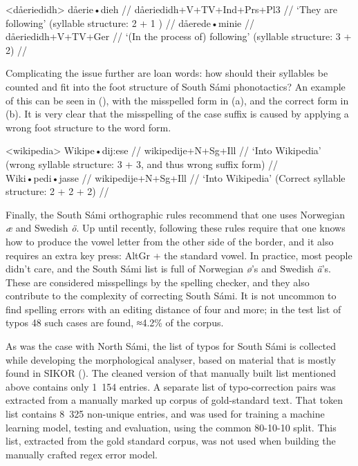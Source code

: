 \documentclass{flammie}
\begin{document}
\pex<dåeriedidh>
\a
\begingl
\gla dåerie•dieh //
\glb dåeriedidh+V+TV+Ind+Prs+Pl3 //
\glft `They are following' (syllable structure: 2 + 1 ) //
\endgl
\a
\begingl
\gla dåerede•minie //
\glb dåeriedidh+V+TV+Ger //
\glft `(In the process of) following' (syllable structure: 3 + 2) //
\endgl
\xe


Complicating the issue further are loan words: how should their syllables be
counted and fit into the foot structure of South Sámi phonotactics? An example
of this can be seen in (\nextx), with the misspelled form in (\nextx a), and the
correct form in (\nextx b). It is very clear that the misspelling of the case
suffix is caused by applying a wrong foot structure to the word form.

\pex<wikipedia>
\a
\begingl
\gla Wikipe•dij:ese //
\glb wikipedije+N+Sg+Ill //
\glft `Into Wikipedia' (wrong syllable structure: 3 + 3, and thus wrong suffix form) //
\endgl
\a
\begingl
\gla Wiki•pedi•jasse //
\glb wikipedije+N+Sg+Ill //
\glft `Into Wikipedia' (Correct syllable structure: 2 + 2 + 2) //
\endgl
\xe


Finally, the South Sámi orthographic rules recommend that one uses Norwegian
\textit{æ} and Swedish \textit{ö}. Up until recently, following these rules
require that one knows how to produce the vowel letter from the other side of
the border, and it also requires an extra key press: AltGr + the standard vowel.
In practice, most people didn't care, and the South Sámi list is full of
Norwegian \textit{ø}'s and Swedish \textit{ä}'s. These are considered
misspellings by the spelling checker, and they also contribute to the complexity
of correcting South Sámi. It is not uncommon to find spelling errors with an
editing distance of four and more; in the test list of typos 48 such cases are
found, ≈4.2\% of the corpus.

As was the case with North Sámi, the list of typos for South Sámi is collected
while developing the morphological analyser, based on material that is mostly
found in SIKOR (\cite{sikor_06.11.2018}). The cleaned version of that manually
built list mentioned above contains only 1~154 entries. A separate list of
typo-correction pairs was extracted from a manually marked up corpus of
gold-standard text. That token list contains 8~325 non-unique entries, and was
used for training a machine learning model, testing and evaluation, using the
common 80-10-10 split. This list, extracted from the gold standard corpus, was
not used when building the manually crafted regex error model.
\end{document}
